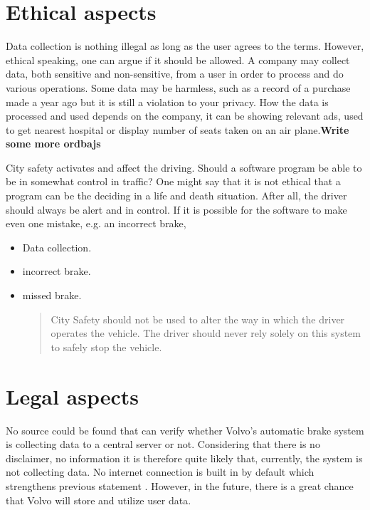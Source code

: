 \documentclass[conference]{IEEEtran}
\begin{document}

\section{Ethical aspects}
Data collection is nothing illegal as long as the user agrees to the terms. However, ethical speaking, one can argue if it should be allowed. A company may collect data, both sensitive and non-sensitive, from a user in order to process and do various operations. Some data may be harmless, such as a record of a purchase made a year ago but it is still a violation to your privacy. How the data is processed and used depends on the company, it can be showing relevant ads, used to get nearest hospital or display number of seats taken on an air plane.\textbf{Write some more ordbajs}

City safety activates and affect the driving. Should a software program be able to be in somewhat control in traffic? One might say that it is not ethical that a program can be the deciding in a life and death situation. After all, the driver should always be alert and in control. If it is possible for the software to make even one mistake, e.g. an incorrect brake, 
\begin{itemize}
	\item Data collection.
	\item incorrect brake.
	\item missed brake.
	\begin{quotation}
		City Safety should not be used to alter the way in which the driver operates the vehicle. The driver should never rely solely on this system to safely stop the vehicle.
	\end{quotation}
\end{itemize}


\section{Legal aspects}
No source could be found that can verify whether Volvo's automatic brake system is collecting data to a central server or not. Considering that there is no disclaimer, no information it is therefore quite likely that, currently, the system is not collecting data. No internet connection is built in by default which strengthens previous statement \cite{SensusConnect}. However, in the future, there is a great chance that Volvo will store and utilize user data.
\end{document}
